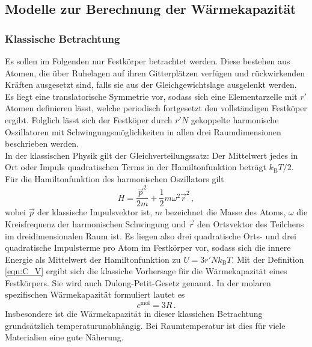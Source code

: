 \subsection{Modelle zur Berechnung der Wärmekapazität}
\label{subsec:modelleWaermekapazitaet}
\subsubsection{Klassische Betrachtung}
Es sollen im Folgenden nur Festkörper betrachtet werden. Diese bestehen aus Atomen, die über Ruhelagen auf ihren Gitterplätzen verfügen und rückwirkenden Kräften ausgesetzt sind, falls sie aus der Gleichgewichtslage ausgelenkt werden. Es liegt eine translatorische Symmetrie vor, sodass sich eine Elementarzelle mit $r'$ Atomen definieren lässt, welche periodisch fortgesetzt den vollständigen Festköper ergibt. Folglich lässt sich der Festköper durch $r'N$ gekoppelte harmonische Oszillatoren mit Schwingungsmöglichkeiten in allen drei Raumdimensionen beschrieben werden.\\
In der klassischen Physik gilt der Gleichverteilungssatz: Der Mittelwert jedes in Ort oder Impuls quadratischen Terms in der Hamiltonfunktion beträgt $k_\text{B} T / 2$. Für die Hamiltonfunktion des harmonischen Oszillators gilt
\begin{equation}
  H = \frac{\vec{p}^2}{2 m} + \frac{1}{2} m \omega^2 \vec{r}^2\,,
  \label{eqn:hamilton}
\end{equation}
wobei $\vec{p}$ der klassische Impulsvektor ist,
$m$ bezeichnet die Masse des Atoms, $\omega$ die Kreisfrequenz der harmonischen Schwingung und $\vec{r}$
den Ortsvektor des Teilchens im dreidimensionalen Raum ist. Es liegen also drei quadratische Orts- und drei quadratische Impulsterme pro Atom im Festkörper vor, sodass sich die innere Energie als Mittelwert der Hamiltonfunktion zu $U = 3 r' N k_\text{B} T$. Mit der Definition \eqref{eqn:C_V} ergibt sich die klassiche Vorhersage für die Wärmekapazität eines Festkörpers. Sie wird auch Dulong-Petit-Gesetz genannt. In der molaren spezifischen Wärmekapazität formuliert lautet es
\begin{equation}
  c^{\text{mol}} = 3 R\,.
  \label{eqn:dulongpetit}
\end{equation}
Insbesondere ist die Wärmekapazität in dieser klassichen Betrachtung grundsätzlich temperaturunabhängig. Bei Raumtemperatur ist dies für viele Materialien eine gute Näherung.

